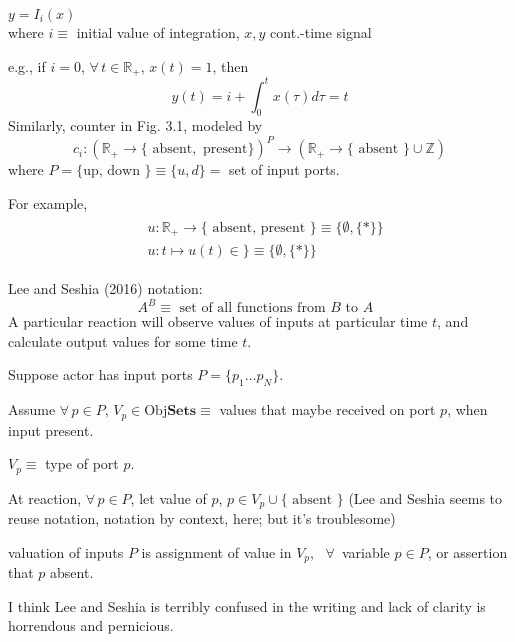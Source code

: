 \documentclass[10pt]{amsart}
\begin{document}
\begin{multicols*}{2}
$y= I_i(x)$  \\
where $i\equiv $ initial value of integration, $x,y$ cont.-time signal 

e.g., if $i=0$, $\forall \, t \in \mathbb{R}_+$, $x(t) = 1$, then 
\[
y(t) = i + \int_0^t x(\tau ) d\tau = t
\]
Similarly, counter in Fig. 3.1, modeled by 
\[
c_i : (\mathbb{R}_+ \to \lbrace \text{ absent} , \text{ present} \rbrace )^P \to (\mathbb{R}_+ \to \lbrace \text{ absent } \rbrace \cup \mathbb{Z})
\]
where $P = \lbrace \text{up, down } \rbrace \equiv \lbrace u ,d \rbrace = $ set of input ports.  

For example, 
\[
\begin{gathered}
\begin{aligned}
& u: \mathbb{R}_+ \to \lbrace \text{ absent, present } \rbrace \equiv \lbrace \emptyset , \lbrace * \rbrace \rbrace \\ 
& u: t \mapsto u(t) \in  \rbrace \equiv \lbrace \emptyset , \lbrace * \rbrace \rbrace 
\end{aligned}
\end{gathered}
\]

Lee and Seshia (2016) \cite{LeSe2016} notation: 
\[
A^B \equiv  \text{ set of all functions from $B$ to $A$ }
\]
A particular reaction will observe values of inputs at particular time $t$, and calculate output values for some time $t$.  

Suppose actor has input ports $P = \lbrace p_1 \dots p_N \rbrace$.  

Assume $\forall \, p \in P$, $V_p \in \text{Obj} \textbf{Sets} \equiv $ values that maybe received on port $p$, when input present.  

$V_p \equiv $ type of port $p$.  

At reaction, $\forall \, p \in P$, let value of $p$, $p\in V_p \cup \lbrace \text{ absent } \rbrace$ (Lee and Seshia seems to reuse notation, notation by context, here; but it's troublesome)

valuation of inputs $P$ is assignment of value in $V_p$, \, $\forall \, $ variable $p\in P$, or assertion that $p $ absent.  

I think Lee and Seshia is terribly confused in the writing and lack of clarity is horrendous and pernicious.  

 





\end{multicols*}
\end{document}
